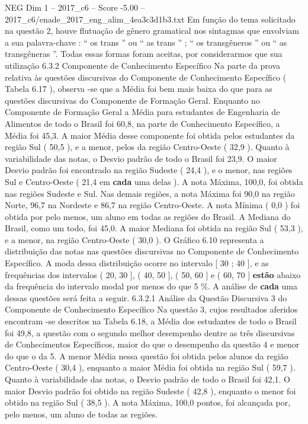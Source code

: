 \begin{textsample}{NEG Dim 1 – 2017\_c6 – Score -5.00 – 2017\_c6/enade\_2017\_eng\_alim\_4ea3c3d1b3.txt}
Em função do tema solicitado na questão 2, houve flutuação de gênero gramatical nos sintagmas que envolviam a sua palavra-chave : “ os trans ” ou “ as trans ” ; “ os transgêneros ” ou “ as transgêneras ”.
Todas essas formas foram aceitas, por considerarmos que sua utilização 6.3.2 Componente de Conhecimento Específico Na parte da prova relativa às questões discursivas do Componente de Conhecimento Específico ( Tabela 6.17 ), observa -se que a Média foi bem mais baixa do que para as questões discursivas do Componente de Formação Geral.
Enquanto no Componente de Formação Geral a Média para estudantes de Engenharia de Alimentos de todo o Brasil foi 60,8, na parte de Conhecimento Específico, a Média foi 45,3.
A maior Média desse componente foi obtida pelos estudantes da região Sul ( 50,5 ), e a menor, pelos da região Centro-Oeste ( 32,9 ).
Quanto à variabilidade das notas, o Desvio padrão de todo o Brasil foi 23,9.
O maior Desvio padrão foi encontrado na região Sudeste ( 24,4 ), e o menor, nas regiões Sul e Centro-Oeste ( 21,4 em \textbf{cada} uma delas ).
A nota Máxima, 100,0, foi obtida nas regiões Sudeste e Sul.
Nas demais regiões, a nota Máxima foi 90,0 na região Norte, 96,7 na Nordeste e 86,7 na região Centro-Oeste.
A nota Mínima ( 0,0 ) foi obtida por pelo menos, um aluno em todas as regiões do Brasil.
A Mediana do Brasil, como um todo, foi 45,0.
A maior Mediana foi obtida na região Sul ( 53,3 ), e a menor, na região Centro-Oeste ( 30,0 ).
O Gráfico 6.10 representa a distribuição das notas nas questões discursivas no Componente de Conhecimento Específico.
A moda dessa distribuição ocorre no intervalo [ 30 ; 40 ], e as frequências dos intervalos ( 20, 30 ], ( 40, 50 ], ( 50, 60 ] e ( 60, 70 ] \textbf{estão} abaixo da frequência do intervalo modal por menos do que 5 \%.
A análise de \textbf{cada} uma dessas questões será feita a seguir. 6.3.2.1 Análise da Questão Discursiva 3 do Componente de Conhecimento Específico Na questão 3, cujos resultados aferidos encontram -se descritos na Tabela 6.18, a Média dos estudantes de todo o Brasil foi 49,8, a questão com o segundo melhor desempenho dentre as três discursivas de Conhecimentos Específicos, maior do que o desempenho da questão 4 e menor do que o da 5.
A menor Média nessa questão foi obtida pelos alunos da região Centro-Oeste ( 30,4 ), enquanto a maior Média foi obtida na região Sul ( 59,7 ).
Quanto à variabilidade das notas, o Desvio padrão de todo o Brasil foi 42,1.
O maior Desvio padrão foi obtido na região Sudeste ( 42,8 ), enquanto o menor foi obtido na região Sul ( 38,5 ).
A nota Máxima, 100,0 pontos, foi alcançada por, pelo menos, um aluno de todas as regiões.

\end{textsample}
